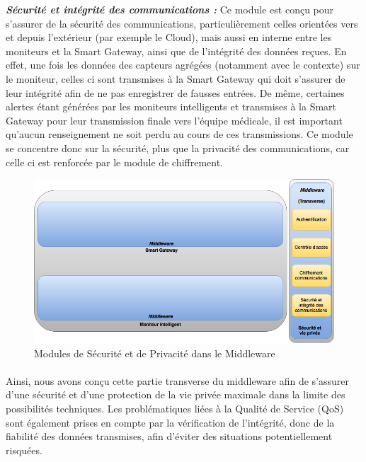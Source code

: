 \textbf{\textit{Sécurité et intégrité des communications :}} Ce module est conçu pour s'assurer de la sécurité des communications, particulièrement celles orientées vers et depuis l'extérieur (par exemple le Cloud), mais aussi en interne entre les moniteurs et la Smart Gateway, ainsi que de l'intégrité des données reçues. En effet, une fois les données des capteurs agrégées (notamment avec le contexte) sur le moniteur, celles ci sont transmises à la Smart Gateway qui doit s'assurer de leur intégrité afin de ne pas enregistrer de fausses entrées. De même, certaines alertes étant générées par les moniteurs intelligents et transmises à la Smart Gateway pour leur transmission finale vers l'équipe médicale, il est important qu'aucun renseignement ne soit perdu au cours de ces transmissions. Ce module se concentre donc sur la sécurité, plus que la privacité des communications, car celle ci est renforcée par le module de chiffrement.\\
\begin{figure}[h!]
	\hspace*{-3cm}
	\centering
	\includegraphics[width=1.5\textwidth]{Figure7.png}
	\caption{Modules de Sécurité et de Privacité dans le Middleware}
	\label{secu}
\end{figure}
\paragraph{}
Ainsi, nous avons conçu cette partie transverse du middleware afin de s'assurer d'une sécurité et d'une protection de la vie
privée maximale dans la limite des possibilités techniques. Les problématiques liées à la Qualité de Service (QoS) sont également
prises en compte par la vérification de l'intégrité, donc de la fiabilité des données transmises, afin d'éviter des situations potentiellement risquées.
